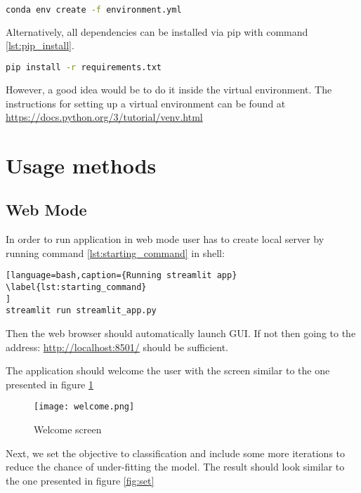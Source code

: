 \documentclass[a4paper,twoside,12pt]{book}
\begin{document}
\begin{lstlisting}[language=bash,caption={installation of anaconda environment from console}, label={lst:env_create}]
conda env create -f environment.yml
\end{lstlisting}

Alternatively, all dependencies can be installed via pip with command \ref{lst:pip_install}.  

\begin{lstlisting}[language=bash,caption={installation with pip}, label={lst:pip_install}]
pip install -r requirements.txt
\end{lstlisting}

However, a good idea would be to do it inside the virtual environment. The instructions for setting up a virtual environment can be found at \url{https://docs.python.org/3/tutorial/venv.html}

\section{Usage methods}

\subsection{Web Mode}

In order to run application in web mode user has to create local server by running command \ref{lst:starting_command} in shell:

\begin{lstlisting}[language=bash,caption={Running streamlit app}
\label{lst:starting_command}
]
streamlit run streamlit_app.py
\end{lstlisting}

Then the web browser should automatically launch GUI. If not then going to the address: \url{http://localhost:8501/} should be sufficient.

The application should welcome the user with the screen similar to the one presented in figure \ref{fig:welcome}

\begin{figure}[!htb]
    \centering
    \texttt{[image: welcome.png]}
    \caption{Welcome screen}
    \label{fig:welcome}
\end{figure}

Next, we set the objective to classification and include some more iterations to reduce the chance of under-fitting the model. The result should look similar to the one presented in figure \ref{fig:set}
\end{document}
